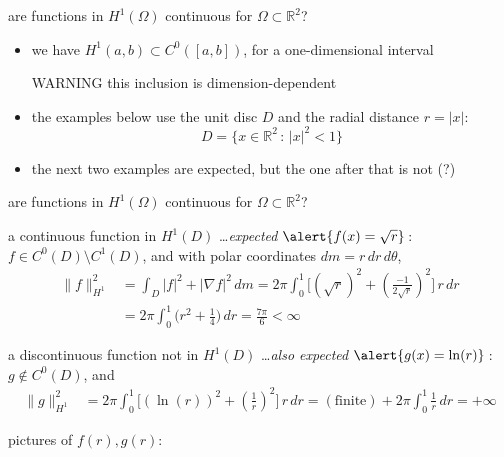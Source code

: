 \documentclass[10pt,
               svgnames,
               hyperref={colorlinks,
                         citecolor=DeepPink4,
                         linkcolor=FireBrick,
                         urlcolor=blue},
               usepdftitle=false]{beamer}
\newcommand{\RR}{\mathbb{R}}
\newcommand{\grad}{\nabla}
\begin{document}
\begin{frame}{are functions in $H^1(\Omega)$ continuous for $\Omega\subset\RR^2$?}

\begin{itemize}
\item we have $H^1(a,b) \subset C^0([a,b])$, for a one-dimensional interval

\begin{block}{WARNING}
\alert{this inclusion is dimension-dependent}
\end{block}

\item the examples below use the unit disc $D$ and the radial distance $r=|x|$:
    $$D = \{x\in\RR^2\,:\,|x|^2<1\}$$
\item the next two examples are expected, but the one after that is not (?)
\end{itemize}
\end{frame}


\begin{frame}{are functions in $H^1(\Omega)$ continuous for $\Omega\subset\RR^2$?}

\begin{block}{a continuous function in $H^1(D)$ \dots \emph{expected}}
{\small
$\alert{f(x)= \sqrt{r}}$\,: \, $f\in C^0(D)\setminus C^1(D)$, and with polar coordinates $dm=r\,dr\,d\theta$,
\begin{align*}
\|f\|_{H^1}^2 &= \int_D |f|^2 + |\grad f|^2\,dm = 2\pi \int_0^1 \Big[(\sqrt{r})^2 + \left(\frac{-1}{2\sqrt{r}}\right)^2\Big]\,r\, dr \\
&= 2\pi \int_0^1 \big(r^2 + \frac{1}{4}\big)\,dr = \frac{7\pi}{6} < \infty
\end{align*}
}
\end{block}

\begin{block}{a discontinuous function not in $H^1(D)$ \dots \emph{also expected}}
{\small
$\alert{g(x)= \ln(r)}$\,: \, $g\notin C^0(D)$, and
\begin{align*}
\|g\|_{H^1}^2 &= 2\pi \int_0^1 \Big[(\ln(r))^2 + \left(\frac{1}{r}\right)^2\Big]\,r\, dr = (\text{finite}) + 2\pi \int_0^1 \frac{1}{r}\, dr = +\infty
\end{align*}
}
\end{block}

\medskip
pictures of $f(r),g(r)$:

\vspace{20mm}
\end{frame}
\end{document}
